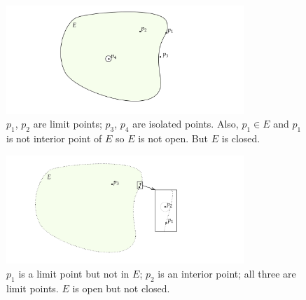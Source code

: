 \begin{figure}[H] \centering
    \includegraphics[width=0.8\textwidth]{figures/d1.png}
    \caption{\label{fig:d1.png}
        $p_1$, $p_2$ are limit points; $p_3$, $p_4$ are isolated points. Also, $p_1 \in E$ and $p_1$ is not interior point of $E$ so $E$ is not open. But $E$ is closed.
    }
\end{figure}

\begin{figure}[H] \centering
    \includegraphics[width=0.8\textwidth]{figures/d2.png}
    \caption{\label{fig:d2.png}
        $p_1$ is a limit point but not in $E$; $p_2$ is an interior point; all three are limit points. $E$ is open but not closed.
    }
\end{figure}

